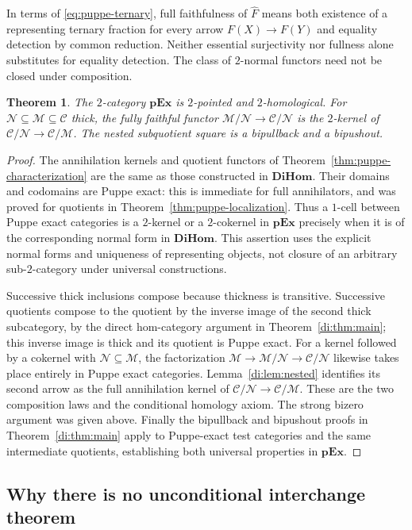 \documentclass[11pt,reqno,a4paper]{amsart}
\newtheorem{theorem}{Theorem}[section]
\theoremstyle{definition}
\theoremstyle{remark}
\newcommand{\C}{\mathcal{C}}
\newcommand{\M}{\mathcal{M}}
\newcommand{\N}{\mathcal{N}}
\newcommand{\0}{\mathbf{0}}
\renewcommand{\1}{\mathbf{1}}
\newcommand{\pExact}{\mathbf{pEx}}
\newcommand{\DiHom}{\mathbf{DiHom}}
\begin{document}
In terms of \eqref{eq:puppe-ternary}, full faithfulness of
$\widehat F$ means both existence of a representing ternary fraction
for every arrow $F(X)\to F(Y)$ and equality detection by common
reduction. Neither essential surjectivity nor fullness alone substitutes
for equality detection. The class of $2$-normal functors need
not be closed under composition.

\begin{theorem}\label{thm:puppe-homological}
The $2$-category $\pExact$ is $2$-pointed and $2$-homological.
For $\N\subseteq\M\subseteq\C$ thick, the fully faithful functor
$\M/\N\to\C/\N$ is the $2$-kernel of $\C/\N\to\C/\M$.
The nested subquotient square is a bipullback and a bipushout.
\end{theorem}
\begin{proof}
The annihilation kernels and quotient functors of
Theorem~\ref{thm:puppe-characterization} are the same as those
constructed in $\DiHom$. Their domains and codomains are Puppe
exact: this is immediate for full annihilators, and was proved for
quotients in Theorem~\ref{thm:puppe-localization}. Thus a $1$-cell
between Puppe exact categories is a $2$-kernel or a $2$-cokernel
in $\pExact$ precisely when it is of the corresponding normal form
in $\DiHom$. This assertion uses the explicit normal forms and
uniqueness of representing objects, not closure of an arbitrary
sub-$2$-category under universal constructions.

Successive thick inclusions compose because thickness is transitive.
Successive quotients compose to the quotient by the inverse image
of the second thick subcategory, by the direct hom-category argument
in Theorem~\ref{di:thm:main}; this inverse image is thick and its
quotient is Puppe exact. For a kernel followed by a cokernel with
$\N\subseteq\M$, the factorization
$\M\to\M/\N\to\C/\N$ likewise takes place entirely in
Puppe exact categories. Lemma~\ref{di:lem:nested} identifies its
second arrow as the full annihilation kernel of
$\C/\N\to\C/\M$. These are the two composition laws and the
conditional homology axiom. The strong bizero argument was given
above. Finally the bipullback and bipushout proofs in
Theorem~\ref{di:thm:main} apply to Puppe-exact test categories and
the same intermediate quotients, establishing both universal
properties in $\pExact$.
\end{proof}

\subsection{Why there is no unconditional interchange theorem}
\end{document}
